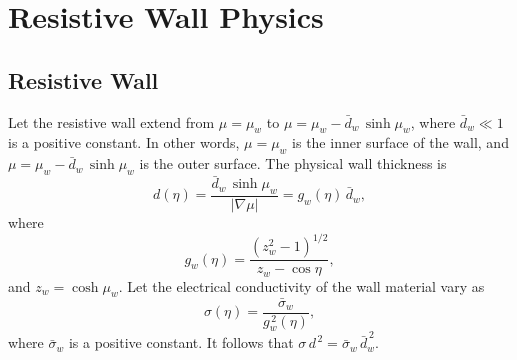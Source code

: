 \documentclass[12pt,prb,aps,notitlepage]{revtex4-1}
\begin{document}
\section{Resistive  Wall Physics}
\subsection{Resistive Wall}
Let the resistive wall extend from $\mu=\mu_w$ to $\mu=\mu_w-\bar{d}_w\,\sinh\mu_w$, where $\bar{d}_w\ll 1$ is a positive constant. In other words, $\mu=\mu_w$ is the inner surface of the wall,
and $\mu=\mu_w-\bar{d}_w\,\sinh\mu_w$ is the outer surface. The physical wall thickness is
\begin{equation}
d(\eta)= \frac{\bar{d}_w\,\sinh\mu_w}{|\nabla \mu|} = g_w(\eta)\,\bar{d}_w,
\end{equation}
where
\begin{equation}
g_w(\eta) = \frac{(z_w^2-1)^{1/2}}{z_w-\cos\eta},
\end{equation}
and $z_w=\cosh\mu_w$. 
Let the electrical conductivity of the wall material vary as
\begin{equation}
\sigma(\eta) = \frac{\bar{\sigma}_w}{g_w^{\,2}(\eta)},
\end{equation}
where $\bar{\sigma}_w$ is a positive constant. It follows that $\sigma\,d^{\,2}=\bar{\sigma}_w\,\bar{d}_w^{\,2}$. 
\end{document}
